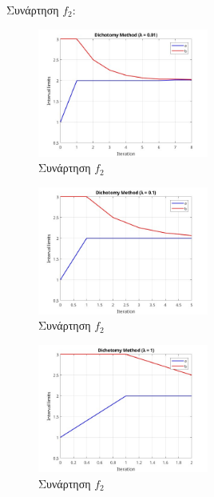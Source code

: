 Συνάρτηση $f_2$:
\begin{figure}[H] %
    \centering
    \includegraphics[width=0.5\textwidth]{media/dichotomyf2_3001} %
    \caption{Συνάρτηση $f_2$}
\end{figure}
\begin{figure}[H] %
    \centering
    \includegraphics[width=0.5\textwidth]{media/dichotomyf2_301} %
    \caption{Συνάρτηση $f_2$}
\end{figure}
\begin{figure}[H] %
    \centering
    \includegraphics[width=0.5\textwidth]{media/dichotomyf2_31} %
    \caption{Συνάρτηση $f_2$}
\end{figure}

